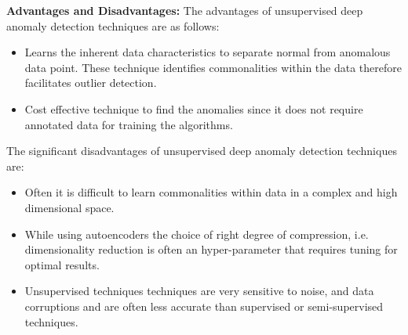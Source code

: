 \textbf{Advantages and Disadvantages:}
The advantages of unsupervised deep anomaly detection techniques are as follows:
\begin{itemize}
\item  Learns the inherent data characteristics to separate normal from anomalous data point. These technique  identifies commonalities within the data therefore facilitates outlier detection.
\item  Cost effective technique to find the anomalies since it does not require annotated data for training the algorithms.
\end{itemize}
The significant disadvantages of unsupervised deep anomaly detection techniques are:
\begin{itemize}
\item  Often it is difficult to learn commonalities within data in a complex and high dimensional space.
\item While using autoencoders the choice of right degree of compression, i.e. dimensionality reduction is often an hyper-parameter that requires tuning for optimal results.
\item Unsupervised techniques techniques are very sensitive to noise, and data corruptions and
       are often less accurate than supervised or semi-supervised techniques.
\end{itemize}








